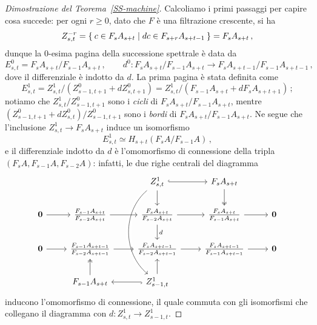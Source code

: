\begin{proof}[Dimostrazione del Teorema~\ref{SS-machine}]
		Calcoliamo i primi passaggi per capire cosa succede: 
		per ogni $r \ge 0$, dato che $F$ è una filtrazione crescente, si ha
		\begin{equation*}
			Z^{-r}_{s,t} = \Set{ c \in F_{s}A_{s+t} | dc \in F_{s+r}A_{s+t-1} } = F_{s}A_{s+t}\,,
		\end{equation*}
		dunque la $0$-esima pagina della successione spettrale è data da
		\begin{equation*}
			E_{s,t}^{0} = F_{s}A_{s+t}/F_{s-1}A_{s+t}\,, \qquad
			d^{0}: F_{s}A_{s+t}/F_{s-1}A_{s+t} \longrightarrow F_{s}A_{s+t-1}/F_{s-1}A_{s+t-1}\,,
		\end{equation*}
		dove il differenziale è indotto da $d$. La prima pagina è stata definita come
		\begin{equation*}
			E_{s,t}^{1} = Z_{s,t}^{1}/(Z_{s-1, t+1}^{0} + dZ_{s,t+1}^{0})
			= Z^{1}_{s,t}/( F_{s-1}A_{s+t} + dF_{s}A_{s+t+1} ) \,;
		\end{equation*}
		notiamo che $Z^{1}_{s,t}/Z^{0}_{s-1,t+1}$ sono i \emph{cicli} 
		di $F_{s}A_{s+t}/F_{s-1}A_{s+t}$,
		mentre $(Z^{0}_{s-1,t+1} + dZ_{s,t}^{0})/Z^{0}_{s-1,t+1}$ sono 
		i \emph{bordi} di $F_{s}A_{s+t}/F_{s-1}A_{s+t}$.
		Ne segue che l'inclusione $Z_{s,t}^{1} \to F_{s}A_{s+t}$ induce un isomorfismo
		\begin{equation*}
			E^{1}_{s,t} \simeq H_{s+t}\left( F_{s}A/F_{s-1}A \right)\,,
		\end{equation*}
		e il differenziale indotto da $d$ è l'omomorfismo di connessione della tripla
		$(F_{s}A, F_{s-1}A, F_{s-2}A)$: infatti, le due righe centrali del diagramma
		\begin{equation*}
			\begin{tikzcd}
                     &                                                     & {Z_{s,t}^{1}} \arrow[ddd, bend right=50, crossing over] \arrow[r, hook] \arrow[d] & F_{s}A_{s+t} \arrow[d, two heads]                 &            \\
\mathbf{0} \arrow[r] & \frac{F_{s-1}A_{s+t}}{F_{s-2}A_{s+t}} \arrow[r]     & \frac{F_{s}A_{s+t}}{F_{s-2}A_{s+t}} \arrow[r] \arrow[d, "d"]    & \frac{F_{s}A_{s+t}}{F_{s-1}A_{s+t}} \arrow[r]     & \mathbf{0} \\
\mathbf{0} \arrow[r] & \frac{F_{s-1}A_{s+t-1}}{F_{s-2}A_{s+t-1}} \arrow[r] & \frac{F_{s}A_{s+t-1}}{F_{s-2}A_{s+t-1}} \arrow[r]               & \frac{F_{s}A_{s+t-1}}{F_{s-1}A_{s+t-1}} \arrow[r] & \mathbf{0} \\
                     & F_{s-1}A_{s+t} \arrow[u, two heads]                 & {Z_{s-1,t}^{1}} \arrow[l, hook] \arrow[u]                       &                                                   &           
\end{tikzcd}
		\end{equation*}
		inducono l'omomorfismo di connessione, il quale commuta con gli isomorfismi 
		che collegano il diagramma con 
		$d : Z^{1}_{s,t} \to Z^{1}_{s-1,t}$.
		

\end{proof}
